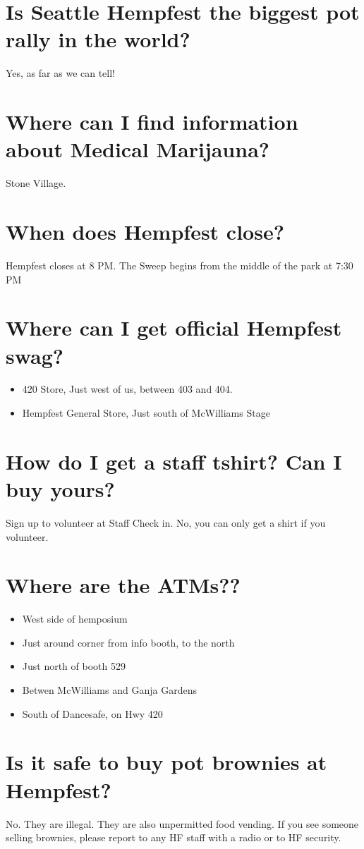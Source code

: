 \section{Is Seattle Hempfest the biggest pot rally in the world?}
Yes, as far as we can tell!

\section{Where can I find information about Medical Marijauna?}
Stone Village.

\section{When does Hempfest close?}
Hempfest closes at 8 PM. The Sweep begins from the middle of the park at 7:30 PM

\section{Where can I get official Hempfest swag?}
\begin{itemize}
	\item 420 Store, Just west of us, between 403 and 404.
	\item Hempfest General Store, Just south of McWilliams Stage
\end{itemize}

\section{How do I get a staff tshirt? Can I buy yours?}
Sign up to volunteer at Staff Check in. No, you can only get a shirt if  you volunteer.

\section{Where are the ATMs??}
\begin{itemize}
	\item West side of hemposium
	\item Just around corner from info booth, to the north
	\item Just north of booth 529
	\item Betwen McWilliams and Ganja Gardens
	\item South of Dancesafe, on Hwy 420
\end{itemize}

\section{Is it safe to buy pot brownies at Hempfest?}
No. They are illegal. They are also unpermitted food vending. If you see someone selling brownies, please report to any HF staff with a radio or to HF security. 

